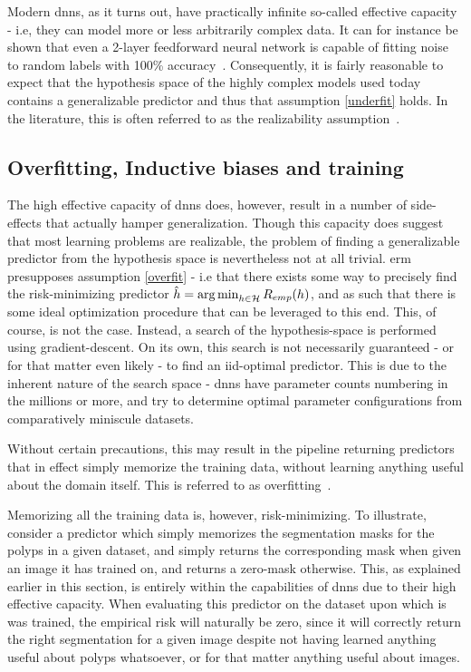 		Modern \glspl{dnn}, as it turns out, have practically infinite so-called effective capacity - i.e, they can model more or less arbitrarily complex data. It can for instance be shown that even a 2-layer feedforward neural network is capable of fitting noise to random labels with 100\% accuracy~\cite{randomlabels}. Consequently, it is fairly reasonable to expect that the hypothesis space of the highly complex models used today contains a generalizable predictor and thus that assumption \ref{underfit} holds. In the literature, this is often referred to as the realizability assumption~\cite{machine_learning_theory}. 
		
	\subsection{Overfitting, Inductive biases and training}
	The high effective capacity of \glspl{dnn} does, however, result in a number of side-effects that actually hamper generalization. Though this capacity does suggest that most learning problems are realizable, the problem of finding a generalizable predictor from the hypothesis space is nevertheless not at all trivial. \gls{erm} presupposes assumption \ref{overfit} - i.e that there exists some way to precisely find the risk-minimizing predictor \(\hat{h} = \operatorname*{arg\,min}_{h \in \mathcal{H}}R_{emp}(h)\), and as such that there is some ideal optimization procedure that can be leveraged to this end. This, of course, is not the case. Instead, a search of the hypothesis-space is performed using gradient-descent. On its own, this search is not necessarily guaranteed - or for that matter even likely - to find an \gls{iid}-optimal predictor. This is due to the inherent nature of the search space - \glspl{dnn} have parameter counts numbering in the millions or more, and try to determine optimal parameter configurations from comparatively miniscule datasets.
		
	Without certain precautions, this may result in the pipeline returning predictors that in effect simply memorize the training data, without learning anything useful about the domain itself. This is referred to as overfitting~\cite{deep_learning_book}. 

	Memorizing all the training data is, however, risk-minimizing. To illustrate, consider a predictor which simply memorizes the segmentation masks for the polyps in a given dataset, and simply returns the corresponding mask when given an image it has trained on, and returns a zero-mask otherwise. This, as explained earlier in this section, is entirely within the capabilities of \glspl{dnn} due to their high effective capacity. When evaluating this predictor on the dataset upon which is was trained, the empirical risk will naturally be zero, since it will correctly return the right segmentation for a given image despite not having learned anything useful about polyps whatsoever, or for that matter anything useful about images.

